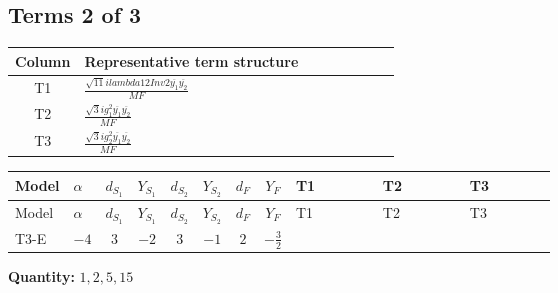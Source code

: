 \documentclass[8pt]{article}
\begin{document}
\begin{landscape}
\subsection*{Terms 2 of 3}
\begin{center}
\begin{tabular}{@{}c >{\raggedright\arraybackslash}p{0.82\linewidth}@{}}
\toprule
Column & Representative term structure \\
\midrule
T1 & \(\displaystyle \frac{\sqrt{11} i lambda12Inv2 \overline{y_{1}} \overline{y_{2}}}{MF}\) \\
\midrule
T2 & \(\displaystyle \frac{\sqrt{3} i g_{1}^{2} \overline{y_{1}} \overline{y_{2}}}{MF}\) \\
\midrule
T3 & \(\displaystyle \frac{\sqrt{3} i g_{2}^{2} \overline{y_{1}} \overline{y_{2}}}{MF}\) \\
\midrule
\bottomrule
\end{tabular}
\end{center}
\smallskip
\tiny
\begin{longtable}{@{}llcccccc >{\raggedright\arraybackslash}p{0.21\linewidth} >{\raggedright\arraybackslash}p{0.21\linewidth} >{\raggedright\arraybackslash}p{0.21\linewidth}@{}}
\toprule
Model & $\alpha$ & $d_{S_1}$ & $Y_{S_1}$ & $d_{S_2}$ & $Y_{S_2}$ & $d_F$ & $Y_F$ & T1 & T2 & T3 \\
\midrule
\endfirsthead
\toprule
Model & $\alpha$ & $d_{S_1}$ & $Y_{S_1}$ & $d_{S_2}$ & $Y_{S_2}$ & $d_F$ & $Y_F$ & T1 & T2 & T3 \\
\midrule
\endhead
T3-E & $-4$ & $3$ & $-2$ & $3$ & $-1$ & $2$ & $-\frac{3}{2}$ & \scriptsize\adjustbox{max width=\linewidth}{$\begin{gathered} \frac{3 \sqrt{11} i lambda12Inv2 \overline{y_{1}} \overline{y_{2}}}{22 MF}\end{gathered}$} & \scriptsize\adjustbox{max width=\linewidth}{$\begin{gathered} \frac{9 \sqrt{3} i g_{1}^{2} \overline{y_{1}} \overline{y_{2}}}{8 MF}\end{gathered}$} & \scriptsize\adjustbox{max width=\linewidth}{$\begin{gathered} \frac{15 \sqrt{3} i g_{2}^{2} \overline{y_{1}} \overline{y_{2}}}{8 MF}\end{gathered}$} \\
\midrule
\bottomrule
\end{longtable}
\clearpage
\noindent\textbf{Quantity: }$\mathrm{1,2,5,15}$\par\smallskip

\end{landscape}
\end{document}
